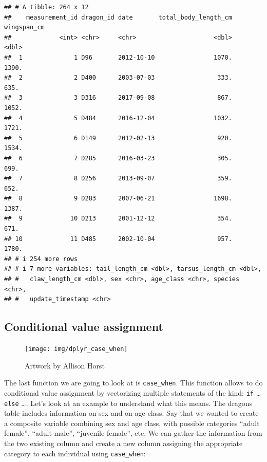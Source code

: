 \documentclass[
]{book}
\begin{document}
\begin{verbatim}
## # A tibble: 264 x 12
##    measurement_id dragon_id date       total_body_length_cm wingspan_cm
##             <int> <chr>     <chr>                     <dbl>       <dbl>
##  1              1 D96       2012-10-10                1070.       1390.
##  2              2 D400      2003-07-03                 333.        635.
##  3              3 D316      2017-09-08                 867.       1052.
##  4              5 D484      2016-12-04                1032.       1721.
##  5              6 D149      2012-02-13                 920.       1534.
##  6              7 D285      2016-03-23                 305.        699.
##  7              8 D256      2013-09-07                 359.        652.
##  8              9 D283      2007-06-21                1698.       1387.
##  9             10 D213      2001-12-12                 354.        671.
## 10             11 D485      2002-10-04                 957.       1780.
## # i 254 more rows
## # i 7 more variables: tail_length_cm <dbl>, tarsus_length_cm <dbl>,
## #   claw_length_cm <dbl>, sex <chr>, age_class <chr>, species <chr>,
## #   update_timestamp <chr>
\end{verbatim}

\hypertarget{conditional-value-assignment}{%
\subsection{Conditional value assignment}\label{conditional-value-assignment}}

\begin{figure}

{\centering \texttt{[image: img/dplyr\_case\_when]} 

}

\caption{Artwork by Allison Horst}\label{fig:tidyfig3}
\end{figure}

The last function we are going to look at is \texttt{case\_when}. This function allows
to do conditional value assignment by vectorizing multiple statements of the
kind: \texttt{if} \ldots{} \texttt{else} \ldots. Let's look at an example to understand what this
means. The dragons table includes information on sex and on age class. Say that
we wanted to create a composite variable combining sex and age class, with
possible categories ``adult female'', ``adult male'', ``juvenile female'', etc. We can
gather the information from the two existing column and create a new column
assigning the appropriate category to each individual using \texttt{case\_when}:
\end{document}
